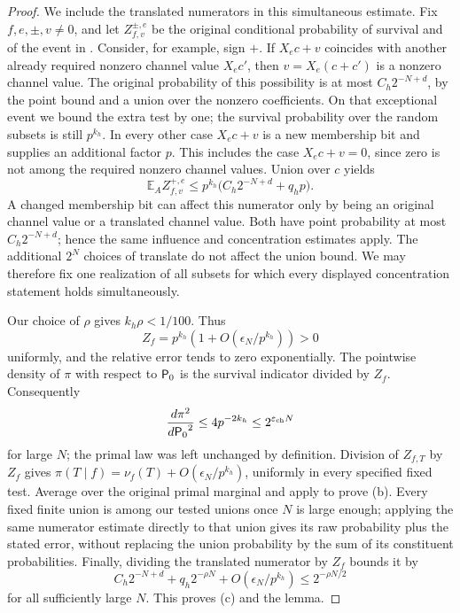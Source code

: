 \begin{proof}
We include the translated numerators in this simultaneous estimate.
Fix \(f,e,\pm,v\ne0\), and let \(Z_{f,v}^{\pm,e}\) be the original
conditional probability of survival and of the event in
.  Consider, for example, sign \(+\).
If \(X_ec+v\) coincides with another already required nonzero channel
value \(X_ec'\), then \(v=X_e(c+c')\) is a nonzero channel value.
The original probability of this possibility is at most
\(C_h2^{-N+d}\), by the point bound and a union over the nonzero
coefficients.  On that exceptional event we bound the extra test by one;
the survival probability over the random subsets is still \(p^{k_h}\).
In every other case \(X_ec+v\) is a new membership bit and supplies an
additional factor \(p\).  This includes the case \(X_ec+v=0\), since
zero is not among the required nonzero channel values.  Union over \(c\)
yields
\[
 \mathbb E_AZ_{f,v}^{+,e}
 \le p^{k_h}\bigl(C_h2^{-N+d}+q_hp\bigr).
\]
A changed membership bit can affect this numerator only by being an
original channel value or a translated channel value.  Both have point
probability at most \(C_h2^{-N+d}\); hence the same influence and
concentration estimates apply.  The additional \(2^N\) choices of
translate do not affect the union bound.  We may therefore fix one
realization of all subsets for which every displayed concentration
statement holds simultaneously.

Our choice of \(\rho\) gives \(k_h\rho<1/100\).  Thus
\[
 Z_f=p^{k_h}(1+O(\epsilon_N/p^{k_h}))>0
\]
uniformly, and the relative error tends to zero exponentially.
The pointwise density of \(\pi\) with respect to \({\mathsf P_0}\) is the
survival indicator divided by \(Z_f\).  Consequently
\[
 \frac{d\pi^2}{d{\mathsf P_0}^2}
 \le4p^{-2k_h}\le2^{\varepsilon_{\rm ch}N}
\]
for large \(N\); the primal law was left unchanged by definition.
Division of \(Z_{f,T}\) by \(Z_f\) gives
\(\pi(T\mid f)=\nu_f(T)+O(\epsilon_N/p^{k_h})\), uniformly in every
specified fixed test.  Average over the original primal marginal and
apply  to prove \textup{(b)}.  Every
fixed finite union is among our tested unions once \(N\) is large enough;
applying the same numerator estimate directly to that union gives its
raw probability plus the stated error, without replacing the union
probability by the sum of its constituent probabilities.  Finally,
dividing the translated
numerator by \(Z_f\) bounds it by
\[
 C_h2^{-N+d}+q_h2^{-\rho N}
       +O(\epsilon_N/p^{k_h})\le2^{-\rho N/2}
\]
for all sufficiently large \(N\).  This proves \textup{(c)} and the lemma.
\end{proof}

